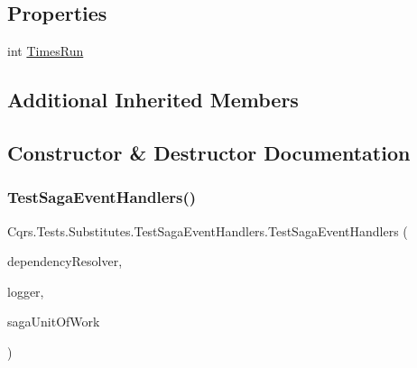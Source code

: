 \subsection*{Properties}
\begin{DoxyCompactItemize}
\item 
int \hyperlink{classCqrs_1_1Tests_1_1Substitutes_1_1TestSagaEventHandlers_aa9ddc3c7e90f6f23bdc1906fae2c0339}{Times\+Run}
\end{DoxyCompactItemize}
\subsection*{Additional Inherited Members}


\subsection{Constructor \& Destructor Documentation}
\mbox{\label{classCqrs_1_1Tests_1_1Substitutes_1_1TestSagaEventHandlers_a3e06754c734bf0d7a3c18a97ce68497a}} 
\subsubsection{\texorpdfstring{Test\+Saga\+Event\+Handlers()}{TestSagaEventHandlers()}\hspace{0.1cm}{\footnotesize\ttfamily [1/2]}}
{\footnotesize\ttfamily Cqrs.\+Tests.\+Substitutes.\+Test\+Saga\+Event\+Handlers.\+Test\+Saga\+Event\+Handlers (\begin{DoxyParamCaption}\item[{\hyperlink{interfaceCqrs_1_1Configuration_1_1IDependencyResolver}{I\+Dependency\+Resolver}}]{dependency\+Resolver,  }\item[{I\+Logger}]{logger,  }\item[{\hyperlink{interfaceCqrs_1_1Domain_1_1ISagaUnitOfWork}{I\+Saga\+Unit\+Of\+Work}$<$ \hyperlink{interfaceCqrs_1_1Authentication_1_1ISingleSignOnToken}{I\+Single\+Sign\+On\+Token} $>$}]{saga\+Unit\+Of\+Work }\end{DoxyParamCaption})}

